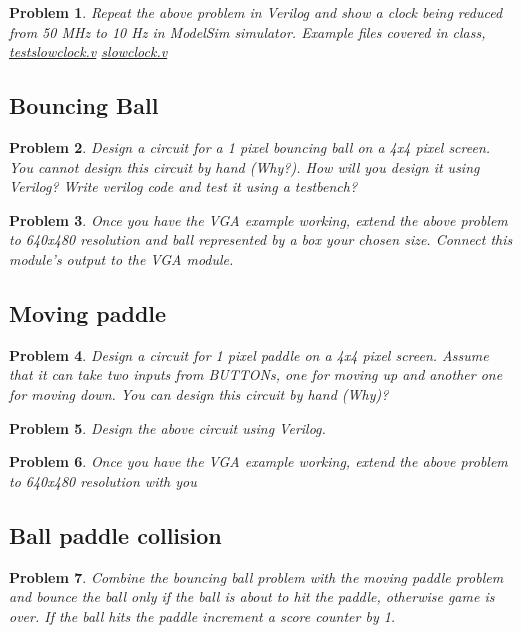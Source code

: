 \documentclass{article}
\newtheorem{prob}{Problem}
\begin{document}
\begin{prob}
  Repeat the above problem in Verilog and show a clock being reduced from 50 MHz
  to 10 Hz in ModelSim simulator. Example files covered in class,
  \href{https://vikasdhiman.info/ECE275-Sequential-Logic/lab_pdfs/pongproject-kickoff/slowclock/testslowclock.sv}{testslowclock.v}
    \href{https://vikasdhiman.info/ECE275-Sequential-Logic/lab_pdfs/pongproject-kickoff/slowclock/slowclock.sv}{slowclock.v}
\end{prob}


\subsection{Bouncing Ball}

\begin{prob}
  Design a circuit for a 1 pixel bouncing ball on a 4x4 pixel screen. You cannot design
this circuit by hand (Why?). How will you design it using Verilog? Write verilog
code and test it using a testbench?
\end{prob}

\begin{prob}
  Once you have the VGA example working, extend the above problem to 640x480
  resolution and ball represented by a box your chosen size. Connect this
  module's output to the VGA module.
\end{prob}

\subsection{Moving paddle}

\begin{prob}
 Design a circuit for 1 pixel paddle on a 4x4 pixel screen. Assume that it can
 take two inputs from BUTTONs, one for moving up and another one for moving
 down. You can design this circuit by hand (Why)?
\end{prob}

\begin{prob}
  Design the above circuit using Verilog.
\end{prob}

\begin{prob}
  Once you have the VGA example working, extend the above problem to 640x480
  resolution with you
\end{prob}

\subsection{Ball paddle collision}

\begin{prob}
  Combine the bouncing ball problem with the moving paddle problem and bounce
  the ball only if the ball is about to hit the paddle, otherwise game is over.
  If the ball hits the paddle increment a score counter by 1.
\end{prob}
\end{document}
